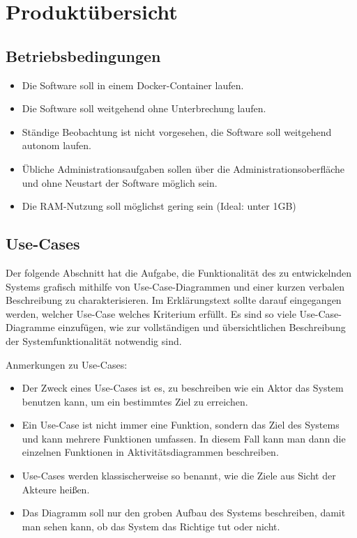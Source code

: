 
\chapter{Produktübersicht}
\label{chap:product_overview}

\section{Betriebsbedingungen}
\begin{itemize}
    \item Die Software soll in einem \gls{Docker}-\gls{Container} laufen.
    \item Die Software soll weitgehend ohne Unterbrechung laufen.
    \item Ständige Beobachtung ist nicht vorgesehen, die Software soll weitgehend autonom laufen.
    \item Übliche Administrationsaufgaben sollen über die Administrationsoberfläche und ohne Neustart der Software möglich sein.
    \item Die \gls{RAM}-Nutzung soll möglichst gering sein (Ideal: unter 1GB)
\end{itemize}

\section{Use-Cases}


Der folgende Abschnitt hat die Aufgabe, die Funktionalität des zu entwickelnden Systems grafisch mithilfe von Use-Case-Diagrammen und einer kurzen verbalen
Beschreibung zu charakterisieren.
Im Erklärungstext sollte darauf eingegangen werden, welcher Use-Case welches Kriterium erfüllt.
Es sind so viele Use-Case-Diagramme einzufügen, wie zur vollständigen und übersichtlichen Beschreibung der Systemfunktionalität notwendig sind.

Anmerkungen zu Use-Cases:

\begin{itemize}
	\item Der Zweck eines Use-Cases ist es, zu beschreiben wie ein Aktor das System benutzen kann, um ein bestimmtes Ziel zu erreichen.
	\item Ein Use-Case ist nicht immer eine Funktion, sondern das Ziel des Systems und kann mehrere Funktionen umfassen.
		In diesem Fall kann man dann die einzelnen Funktionen in Aktivitätsdiagrammen beschreiben.
	\item Use-Cases werden klassischerweise so benannt, wie die Ziele aus Sicht der Akteure heißen.
	\item Das Diagramm soll nur den groben Aufbau des Systems beschreiben, damit man sehen kann, ob das System das Richtige tut oder nicht.
\end{itemize}


